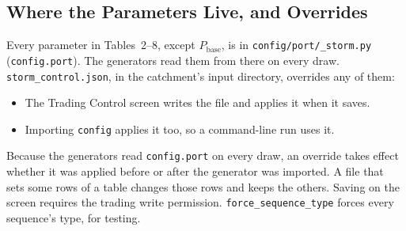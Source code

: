 \documentclass[11pt,a4paper]{article}
\begin{document}
\subsection{Where the Parameters Live, and Overrides}
Every parameter in Tables~2--8, except $P_{\text{base}}$, is in \texttt{config/port/\_storm.py}
(\texttt{config.port}). The generators read them from there on every draw.
\texttt{storm\_control.json}, in the catchment's input directory, overrides any of them:
\begin{itemize}[nosep]
    \item The Trading Control screen writes the file and applies it when it saves.
    \item Importing \texttt{config} applies it too, so a command-line run uses it.
\end{itemize}
Because the generators read \texttt{config.port} on every draw, an override takes effect
whether it was applied before or after the generator was imported. A file that sets some
rows of a table changes those rows and keeps the others. Saving on the screen requires the
trading write permission. \texttt{force\_sequence\_type} forces every sequence's type, for
testing.

\mkmimplementation
\end{document}
